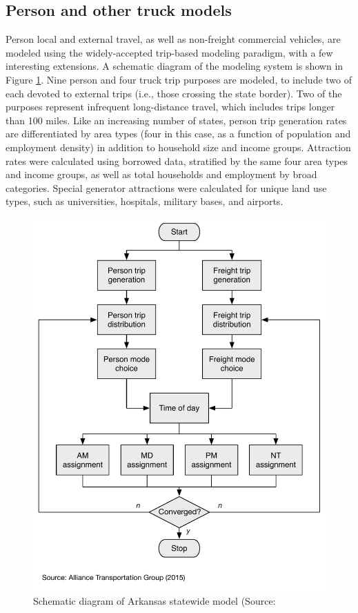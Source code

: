 \subsection{Person and other truck models}

Person local and external travel, as well as non-freight commercial vehicles, are modeled using the widely-accepted trip-based modeling paradigm, with a few interesting extensions. A schematic diagram of the modeling system is shown in Figure \ref{fig:arkansas-flowchart}. Nine person and four truck trip purposes are modeled, to include two of each devoted to external trips (i.e., those crossing the state border). Two of the purposes represent infrequent long-distance travel, which includes trips longer than 100 miles. Like an increasing number of states, person trip generation rates are differentiated by area types (four in this case, as a function of population and employment density) in addition to household size and income groups. Attraction rates were calculated using borrowed data, stratified by the same four area types and income groups, as well as total households and employment by broad categories. Special generator attractions were calculated for unique land use types, such as universities, hospitals, military bases, and airports.

\begin{figure}[!t]
\centering
\includegraphics[scale=0.6]{graphics/52-arkansas-flowchart}
\caption[Schematic diagram of Arkansas statewide model]{Schematic diagram of Arkansas statewide model (Source: \cite{alliance15}}
\label{fig:arkansas-flowchart}
\end{figure}

